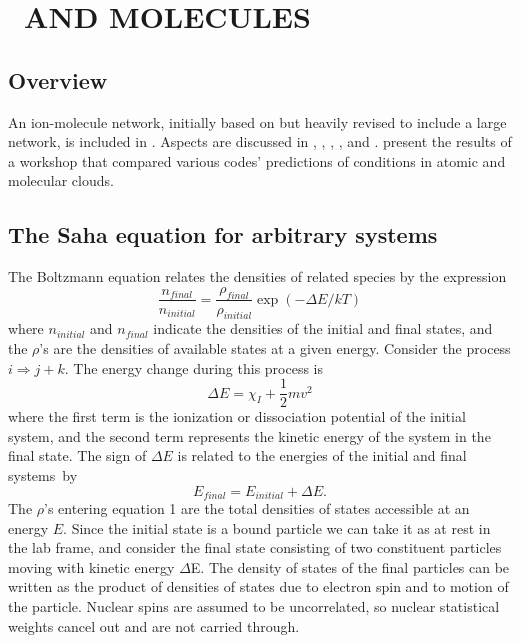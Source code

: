 \chapter{\hminus\ AND MOLECULES}

\section{Overview}

An ion-molecule network, initially based on \citet{Black1978} but heavily
revised to include a large network, is included in \Cloudy.  Aspects are
discussed in \citet{Ferland1989}, \citet{Ferland1994},
\citet{FerlandFabian2002}, \citet{Henney2005}, and \citet{Abel2005}.
\citet{Roellig2007} present
the results of a workshop that compared various codes' predictions of
conditions in atomic and molecular clouds.

\section{The Saha equation for arbitrary systems}

The Boltzmann equation relates the densities of related species by the
expression
\begin{equation}
\label{eqn:BoltzmannPopulations}
\frac{{{n_{final}}}}{{{n_{initial}}}} = \frac{{{\rho _{final}}}}{{{\rho
_{initial}}}}\exp \left( { - \Delta E/kT} \right)
\end{equation}
where $n_{initial}$  and $n_{final}$  indicate the densities of the initial and final
states, and the $\rho$'s are the densities of available states at a given energy.
Consider the process $i \Rightarrow j+k$.  The energy change during this process is
\begin{equation}
\Delta E = {\chi _I} + \frac{1}{2}m{v^2}
\end{equation}
where the first term is the ionization or dissociation potential of the
initial system, and the second term represents the kinetic energy of the
system in the final state.  The sign of $\Delta E$ is related to the energies of
the initial and final systems~by
\begin{equation}
{E_{final}} = {E_{initial}} + \Delta E.
\end{equation}
The $\rho$'s entering equation 1 are the total densities of states accessible
at an energy $E$.  Since the initial state is a bound particle we can take
it as at rest in the lab frame, and consider the final state consisting
of two constituent particles moving with kinetic energy $\Delta$E.  The density
of states of the final particles can be written as the product of densities
of states due to electron spin and to motion of the particle.  Nuclear spins
are assumed to be uncorrelated, so nuclear statistical weights cancel out
and are not carried through.

